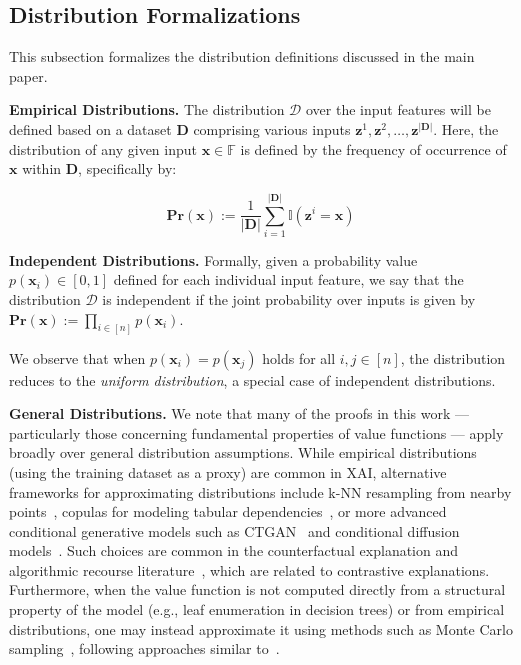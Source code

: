 \documentclass{article}
\newcommand{\z}{\textbf{z}}
\newcommand{\x}{\textbf{x}}
\begin{document}


\subsection{Distribution Formalizations}

\label{distribution_formaliations_subsec}

This subsection formalizes the distribution definitions discussed in the main paper.


\textbf{Empirical Distributions.} The distribution $\mathcal{D}$ over the input features will be defined based on a dataset $\mathbf{D}$ comprising various inputs $\z^1, \z^2,\ldots, \z^{|\mathbf{D}|}$. Here, the distribution of any given input $\x \in \mathbb{F}$ is defined by the frequency of occurrence of $\x$ within $\mathbf{D}$, specifically by:

\begin{equation}
    \textbf{Pr}(\x):=\frac{1}{|\mathbf{D}|}\sum_{i=1}^{|\mathbf{D}|}\mathbb{I}(\z^i=\x)
\end{equation}


\textbf{Independent Distributions.} Formally, given a probability value $p(\x_i) \in [0,1]$ defined for each individual input feature, we say that the distribution $\mathcal{D}$ is independent if the joint probability over inputs is given by $\textbf{Pr}(\x) := \prod_{i \in [n]} p(\x_i)$.

We observe that when $p(\x_i)=p(\x_j)$ holds for all $i,j\in [n]$, the distribution reduces to the \emph{uniform distribution}, a special case of independent distributions.

\textbf{General Distributions.} We note that many of the proofs in this work --- particularly those concerning fundamental properties of value functions --- apply broadly over general distribution assumptions. While empirical distributions (using the training dataset as a proxy) are common in XAI, alternative frameworks for approximating distributions include k-NN resampling from nearby points~\citep{li2023k, almanjahie2018knn, gweon2019k}, copulas for modeling tabular dependencies~\citep{grosser2022copulae}, or more advanced conditional generative models such as CTGAN~\citep{xu2019modeling} and conditional diffusion models~\citep{huang2022fastdiff}. Such choices are common in the counterfactual explanation and algorithmic recourse literature~\citep{karimi2021algorithmic, fokkema2024risks, fokkema2023attribution, verma2024counterfactual}, which are related to contrastive explanations. Furthermore, when the value function is not computed directly from a structural property of the model (e.g., leaf enumeration in decision trees) or from empirical distributions, one may instead approximate it using methods such as Monte Carlo sampling~\citep{hastings1970monte}, following approaches similar to~\citep{subercaseaux2024probabilistic, lopardo2023sea}.
\end{document}
